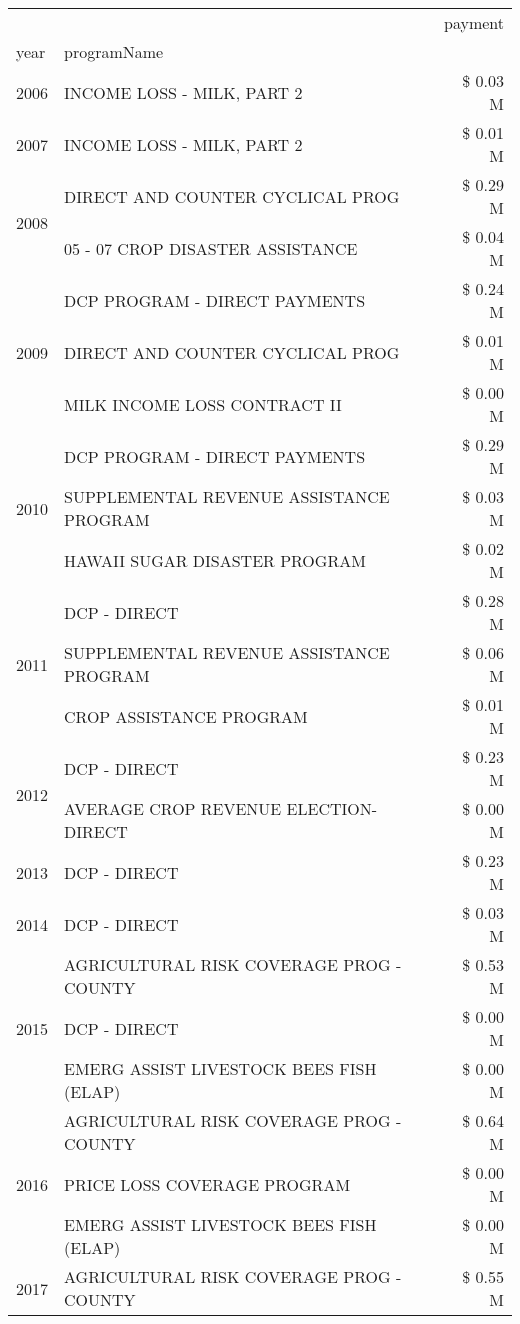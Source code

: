 \begin{tabular}{llr}
\toprule
 &  & payment \\
year & programName &  \\
\midrule
2006 & INCOME LOSS - MILK, PART 2 & \$ 0.03 M \\
\cline{1-3}
2007 & INCOME LOSS - MILK, PART 2 & \$ 0.01 M \\
\cline{1-3}
\multirow[t]{2}{*}{2008} & DIRECT AND COUNTER CYCLICAL PROG & \$ 0.29 M \\
 & 05 - 07 CROP DISASTER ASSISTANCE & \$ 0.04 M \\
\cline{1-3}
\multirow[t]{3}{*}{2009} & DCP PROGRAM - DIRECT PAYMENTS & \$ 0.24 M \\
 & DIRECT AND COUNTER CYCLICAL PROG & \$ 0.01 M \\
 & MILK INCOME LOSS CONTRACT II & \$ 0.00 M \\
\cline{1-3}
\multirow[t]{3}{*}{2010} & DCP PROGRAM - DIRECT PAYMENTS & \$ 0.29 M \\
 & SUPPLEMENTAL REVENUE ASSISTANCE PROGRAM & \$ 0.03 M \\
 & HAWAII SUGAR DISASTER PROGRAM & \$ 0.02 M \\
\cline{1-3}
\multirow[t]{3}{*}{2011} & DCP - DIRECT & \$ 0.28 M \\
 & SUPPLEMENTAL REVENUE ASSISTANCE PROGRAM & \$ 0.06 M \\
 & CROP ASSISTANCE PROGRAM & \$ 0.01 M \\
\cline{1-3}
\multirow[t]{2}{*}{2012} & DCP - DIRECT & \$ 0.23 M \\
 & AVERAGE CROP REVENUE ELECTION-DIRECT & \$ 0.00 M \\
\cline{1-3}
2013 & DCP - DIRECT & \$ 0.23 M \\
\cline{1-3}
2014 & DCP - DIRECT & \$ 0.03 M \\
\cline{1-3}
\multirow[t]{3}{*}{2015} & AGRICULTURAL RISK COVERAGE PROG - COUNTY & \$ 0.53 M \\
 & DCP - DIRECT & \$ 0.00 M \\
 & EMERG ASSIST LIVESTOCK BEES FISH (ELAP) & \$ 0.00 M \\
\cline{1-3}
\multirow[t]{3}{*}{2016} & AGRICULTURAL RISK COVERAGE PROG - COUNTY      & \$ 0.64 M \\
 & PRICE LOSS COVERAGE PROGRAM                   & \$ 0.00 M \\
 & EMERG ASSIST LIVESTOCK BEES FISH (ELAP)       & \$ 0.00 M \\
\cline{1-3}
\multirow[t]{3}{*}{2017} & AGRICULTURAL RISK COVERAGE PROG - COUNTY & \$ 0.55 M \\

\end{tabular}
